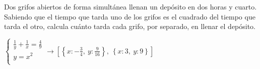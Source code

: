 \documentclass[addpoints,spanish, 12pt,a4paper]{exam}
\begin{document}
\begin{questions}
\question[2] Dos grifos abiertos de forma simultánea llenan un depósito en dos horas y cuarto. 
Sabiendo que el tiempo que tarda uno de los grifos es el cuadrado del tiempo que tarda el otro, 
calcula cuánto tarda cada grifo, por separado, en llenar el depósito.

\begin{solution}
$\left\{ \begin{matrix}\frac{1}{y} + \frac{1}{x} = \frac{4}{9} \\ y = x^{2} \\ \end{matrix}\right.$$\to \left[ \left\{ x : - \frac{3}{4}, \  y : \frac{9}{16}\right\}, \  \left\{ x : 3, \  y : 9\right\}\right]$
\end{solution}






\end{questions}
\end{document}
